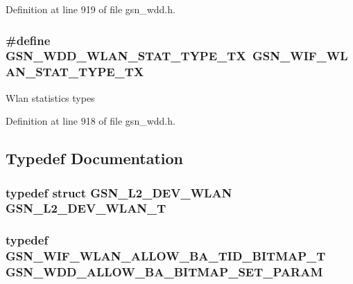 Definition at line 919 of file gsn\_\-wdd.h.

\hypertarget{a00603_a8487e8e5eda472ed8392357a081358f2}{
\subsubsection[{GSN\_\-WDD\_\-WLAN\_\-STAT\_\-TYPE\_\-TX}]{\setlength{\rightskip}{0pt plus 5cm}\#define GSN\_\-WDD\_\-WLAN\_\-STAT\_\-TYPE\_\-TX~GSN\_\-WIF\_\-WLAN\_\-STAT\_\-TYPE\_\-TX}}
\label{a00603_a8487e8e5eda472ed8392357a081358f2}
Wlan statistics types 

Definition at line 918 of file gsn\_\-wdd.h.



\subsection{Typedef Documentation}
\hypertarget{a00603_aa56847c4ab1a6ceb37bdb04c5bcb1d0c}{
\subsubsection[{GSN\_\-L2\_\-DEV\_\-WLAN\_\-T}]{\setlength{\rightskip}{0pt plus 5cm}typedef struct {\bf GSN\_\-L2\_\-DEV\_\-WLAN}  {\bf GSN\_\-L2\_\-DEV\_\-WLAN\_\-T}}}
\label{a00603_aa56847c4ab1a6ceb37bdb04c5bcb1d0c}
\hypertarget{a00603_afa9ab8eb88c695b390fd27c68bfdfefa}{
\subsubsection[{GSN\_\-WDD\_\-ALLOW\_\-BA\_\-BITMAP\_\-SET\_\-PARAM}]{\setlength{\rightskip}{0pt plus 5cm}typedef {\bf GSN\_\-WIF\_\-WLAN\_\-ALLOW\_\-BA\_\-TID\_\-BITMAP\_\-T} {\bf GSN\_\-WDD\_\-ALLOW\_\-BA\_\-BITMAP\_\-SET\_\-PARAM}}}
\label{a00603_afa9ab8eb88c695b390fd27c68bfdfefa}



